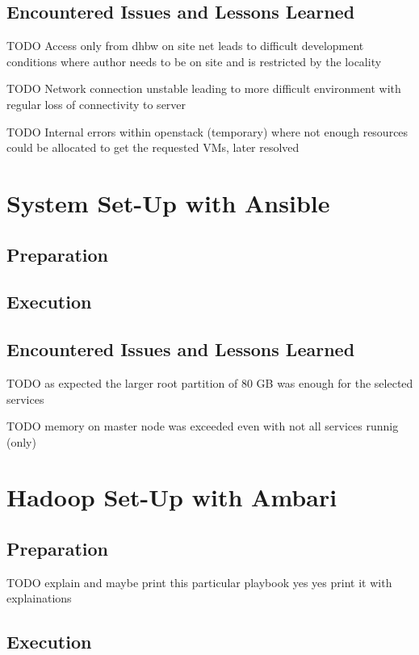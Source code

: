 \subsection{Encountered Issues and Lessons Learned}

TODO Access only from dhbw on site net leads to difficult development conditions where author needs to be on site and is restricted by the locality

TODO Network connection unstable leading to more difficult environment with regular loss of connectivity to server

TODO Internal errors within openstack (temporary) where not enough resources could be allocated to get the requested VMs, later resolved


\section{System Set-Up with Ansible}

\subsection{Preparation}

\subsection{Execution}

\subsection{Encountered Issues and Lessons Learned}

TODO as expected the larger root partition of 80 GB was enough for the selected services

TODO memory on master node was exceeded even with not all services runnig (only)


\section{Hadoop Set-Up with Ambari}

\subsection{Preparation}

TODO explain and maybe print this particular playbook yes yes print it with explainations

\subsection{Execution}

